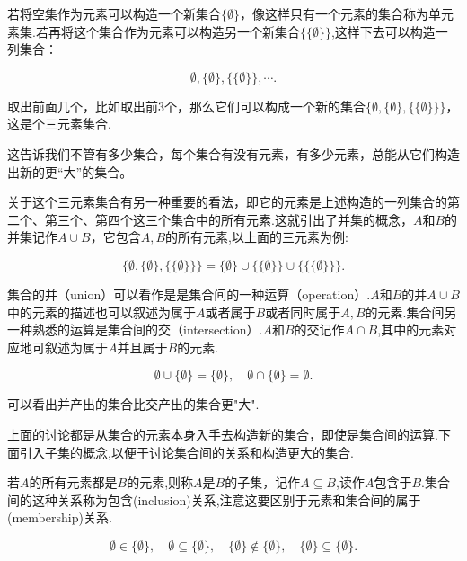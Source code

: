 若将空集作为元素可以构造一个新集合$\{\emptyset\}$，像这样只有一个元素的集合称为单元素集.若再将这个集合作为元素可以构造另一个新集合$\{\{\emptyset\}\}$,这样下去可以构造一列集合：

\[
\emptyset,\{\emptyset\},\{\{\emptyset\}\},\cdots .   
\]

取出前面几个，比如取出前$3$个，那么它们可以构成一个新的集合$\{\emptyset,\{\emptyset\},\{\{\emptyset\}\}\}$，这是个三元素集合.

\begin{note}
    这告诉我们不管有多少集合，每个集合有没有元素，有多少元素，总能从它们构造出新的更“大”的集合。
\end{note}

关于这个三元素集合有另一种重要的看法，即它的元素是上述构造的一列集合的第二个、第三个、第四个这三个集合中的所有元素.这就引出了并集的概念，$A$和$B$的并集记作$A\cup B$，它包含$A,B$的所有元素,以上面的三元素为例:

\begin{example}
    \[
    \{\emptyset,\{\emptyset\},\{\{\emptyset\}\}\}=\{\emptyset\}\cup\{\{\emptyset\}\}\cup\{\{\{\emptyset\}\}\}.
\]
\end{example}

集合的并（union）可以看作是是集合间的一种运算（operation）.$A$和$B$的并$A\cup B$中的元素的描述也可以叙述为属于$A$或者属于$B$或者同时属于$A,B$的元素.集合间另一种熟悉的运算是集合间的交（intersection）.$A$和$B$的交记作$A\cap B$,其中的元素对应地可叙述为属于$A$并且属于$B$的元素.

\begin{example}
    \[
    \emptyset\cup\{\emptyset\}=\{\emptyset\},\quad \emptyset\cap\{\emptyset\}=\emptyset.    
    \]
\end{example}
\begin{note}
    可以看出并产出的集合比交产出的集合更"大".
\end{note}

\begin{note}
    上面的讨论都是从集合的元素本身入手去构造新的集合，即使是集合间的运算.下面引入子集的概念,以便于讨论集合间的关系和构造更大的集合.
\end{note}

若$A$的所有元素都是$B$的元素,则称$A$是$B$的子集，记作$A\subseteq B$,读作$A$包含于$B$.集合间的这种关系称为包含(inclusion)关系,注意这要区别于元素和集合间的属于(membership)关系.

\begin{example}
    \[
        \emptyset\in\{\emptyset\},\quad
        \emptyset\subseteq\{\emptyset\},\quad \{\emptyset\}\notin\{\emptyset\},\quad \{\emptyset\}\subseteq\{\emptyset\}.
    \]
\end{example}

